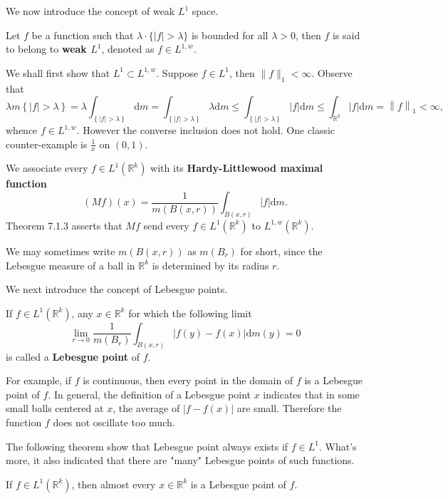 We now introduce the concept of weak $L^1$ space.
\begin{definition}
Let $f$ be a function such that $\lambda\cdot\{|f|>\lambda\}$ is bounded for all $\lambda>0$, then $f$ is said to belong to \textbf{weak $L^1$}, denoted as $f\in L^{1,w}$.
\end{definition}
We shall first show that $L^1\subset L^{1,w}$. Suppose $f\in L^1$, then $\|f\|_1<\infty$. Observe that 
$$
\lambda m\left\{ \left| f \right|>\lambda \right\} =\lambda \int_{\left\{ \left| f \right|>\lambda \right\}}{\mathrm{d}m}=\int_{\left\{ \left| f \right|>\lambda \right\}}{\lambda \mathrm{d}m}\le \int_{\left\{ \left| f \right|>\lambda \right\}}{\left| f \right|\mathrm{d}m}\le \int_{\mathbb{R} ^k}{\left| f \right|\mathrm{d}m}=\left\| f \right\| _1<\infty ,
$$
whence $f\in L^{1,w}$. However the converse inclusion does not hold. One classic counter-example is $\frac{1}{x}$ on $(0,1)$.\par
We associate every $f\in L^1(\mathbb{R}^k)$ with its \textbf{Hardy-Littlewood maximal function} 
$$
\left( Mf\right) \left( x \right) =\frac{1}{m\left( B\left( x,r \right) \right)}\int_{B\left( x,r \right)}{\left| f \right|\mathrm{d}m}.
$$
Theorem 7.1.3 asserts that $Mf$ send every $f\in L^1(\mathbb{R}^k)$ to $L^{1,w}(\mathbb{R}^k)$.\par
We may sometimes write $m(B(x,r))$ as $m(B_r)$ for short, since the Lebesgue measure of a ball in $\mathbb{R}^k$ is determined by its radius $r$.\par
We next introduce the concept of Lebesgue points.
\begin{definition}
If $f\in L^1(\mathbb{R}^k)$, any $x\in\mathbb{R}^k$ for which the following limit 
$$
\lim_{r\rightarrow 0} \frac{1}{m\left( B_r \right)}\int_{B\left( x,r \right)}{\left| f\left( y \right) -f\left( x \right) \right|\mathrm{d}m\left( y \right)}=0
$$
is called a \textbf{Lebesgue point} of $f$.
\end{definition}
For example, if $f$ is continuous, then every point in the domain of $f$ is a Lebesgue point of $f$. In general, the definition of a Lebesgue point $x$ indicates that in some small balls centered at $x$, the average of $|f-f(x)|$ are small. Therefore the function $f$ does not oscillate too much.\par
The following theorem show that Lebesgue point always exists if $f\in L^1$. What's more, it also indicated that there are "many" Lebesgue points of such functions.
\begin{theorem}
If $f\in L^1(\mathbb{R}^k)$, then almost every $x\in\mathbb{R}^k$ is a Lebesgue point of $f$.
\end{theorem}
